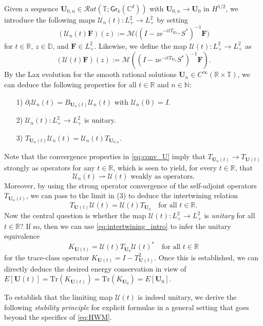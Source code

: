 \documentclass[10pt,reqno,a4paper]{amsart}
\theoremstyle{definition}
\theoremstyle{remark}
\theoremstyle{remark}
\numberwithin{equation}{section}
\newcommand{\C}{\mathbb{C}}
\newcommand{\N}{\mathbb{N}}
\newcommand{\R}{\mathbb{R}}
\newcommand{\T}{\mathbb{T}}
\newcommand{\D}{\mathbb{D}}
\newcommand{\Mean}{\mathscr{M}}
\newcommand{\pt}{\partial}
\newcommand{\be}{\begin{equation}}
\newcommand{\ee}{\end{equation}}
\newcommand{\weakto}{\rightharpoonup}
\newcommand{\eu}{\mathrm{e}}
\newcommand{\Ub}{\mathbf{U}}
\newcommand{\Fb}{\mathbf{F}}
\newcommand{\id}{I}
\newcommand{\Tr}{\mathrm{Tr}}
\newcommand{\Gr}{\mathsf{Gr}}
\newcommand{\Us}{\mathscr{U}}
\begin{document}
Given a sequence $\Ub_{0,n} \in \mathcal{R}at(\T; \Gr_k(\C^d))$ with $\Ub_{0,n} \to \Ub_0$ in $H^{1/2}$, we introduce the following maps $\Us_n(t) : L^2_+ \to L^2_+$ by setting
\be
(\Us_n(t) \Fb)(z) := \Mean  \big ( (\id - z \eu^{-it T_{\Ub_{0,n}}} S^*)^{-1} \Fb \big ) 
\ee
for $t \in \R$, $z \in \D$, and $\Fb \in L^2_+$. Likewise, we define the map $\Us(t) : L^2_+ \to L^2_+$ as
\be \label{def:Us_intro}
(\Us(t) \Fb)(z) := \Mean \left ( (\id - z \eu^{-it T_{\Ub_{0}}} S^*)^{-1} \Fb \right ).
\ee
By the Lax evolution for the smooth rational solutions $\Ub_n \in C^\infty(\R \times \T)$, we can deduce the following properties for all $t \in \R$ and $n \in \N$:
\begin{enumerate}
\item[1)] $\pt_t \Us_n(t) = B_{\Ub_n(t)} \Us_n(t)$ with $\Us_n(0) = \id$.
\item[2)] $\Us_n(t) : L^2_+ \to L^2_+$ is unitary. 
\item[3)] $T_{\Ub_n(t)} \Us_n(t) = \Us_n(t) T_{\Ub_{0,n}}$.
\end{enumerate}
Note that the convergence properties in \eqref{eq:conv_U} imply that $T_{\Ub_n(t)} \to T_{\Ub(t)}$ strongly as operators for any $t \in \R$, which is seen to yield, for every $t \in \R$, that 
$$
\mbox{$\Us_n(t) \weakto \Us(t)$ weakly as operators}.
$$ 
Moreover, by using the strong operator convergence of the self-adjoint operators $T_{\Ub_n(t)}$, we can pass to the limit in (3) to deduce the intertwining relation
\be \label{eq:intertwining_intro}
T_{\Ub(t)} \Us(t) = \Us(t) T_{\Ub_0} \quad \mbox{for all $t \in \R$}.
\ee
Now the central question is whether the map $\Us(t) : L^2_+ \to L^2_+$ is {\em unitary} for all $t \in \R$? If so, then we can use \eqref{eq:intertwining_intro} to infer the unitary equivalence
$$
K_{\Ub(t)} = \Us(t) T_{\Ub_0} \Us(t)^* \quad \mbox{for all $t \in \R$}
$$
for the trace-class operator $K_{\Ub(t)} = \id - T_{\Ub(t)}^2$. Once this is established, we can directly deduce the desired energy conservation in view of $E[\Ub(t)] = \Tr (K_{\Ub(t)}) = \Tr(K_{\Ub_0}) = E[\Ub_0]$.

To establish that the limiting map $\Us(t)$ is indeed unitary, we derive the following {\em stability principle} for explicit formulae in a general setting that goes beyond the specifics of \eqref{eq:HWM}. 
\end{document}
